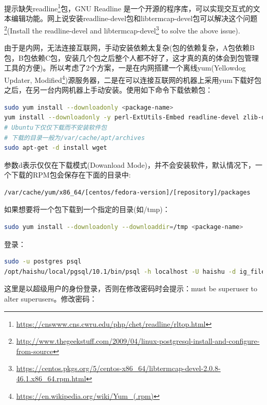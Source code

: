\documentclass[12pt]{book}
\numberwithin{dummy}{section}
\theoremstyle{ocrenumbox}
\theoremstyle{blacknumex}
\theoremstyle{blacknumbox}
\theoremstyle{ocrenum}
\begin{document}
提示缺失readline\footnote{\url{https://cnswww.cns.cwru.edu/php/chet/readline/rltop.html}}包，GNU Readline 是一个开源的程序库，可以实现交互式的文本编辑功能。网上说安装readline-devel包和libtermcap-devel包可以解决这个问题\footnote{\url{http://www.thegeekstuff.com/2009/04/linux-postgresql-install-and-configure-from-source}}(Install the readline-devel and libtermcap-devel\footnote{\url{https://centos.pkgs.org/5/centos-x86_64/libtermcap-devel-2.0.8-46.1.x86_64.rpm.html}} to solve the above issue).

由于是内网，无法连接互联网，手动安装依赖太复杂(包的依赖复杂，A包依赖B包，B包依赖C包，安装几个包之后整个人都不好了，这才真的真的体会到包管理工具的方便)。所以考虑了2个方案，一是在内网搭建一个离线yum(Yellowdog Updater, Modified\footnote{\url{https://en.wikipedia.org/wiki/Yum_(.rpm)}})源服务器，二是在可以连接互联网的机器上采用yum下载好包之后，在另一台内网机器上手动安装。使用如下命令下载依赖包：

\begin{lstlisting}[language=Bash]
sudo yum install --downloadonly <package-name>
yum install --downloadonly -y perl-ExtUtils-Embed readline-devel zlib-devel pam-devel libxml2-devel libxslt-devel openldap-devel python-devel gcc-c++ openssl-devel cmake
# Ubuntu下仅仅下载而不安装软件包
# 下载的目录一般为/var/cache/apt/archives
sudo apt-get -d install wget
\end{lstlisting}

参数d表示仅仅在下载模式(Dowanload Mode)，并不会安装软件，默认情况下，一个下载的RPM包会保存在下面的目录中:

\begin{lstlisting}[language=Bash]
/var/cache/yum/x86_64/[centos/fedora-version]/[repository]/packages 
\end{lstlisting}

如果想要将一个包下载到一个指定的目录(如/tmp)：

\begin{lstlisting}[language=Bash]
sudo yum install --downloadonly --downloaddir=/tmp <package-name> 
\end{lstlisting}


登录：

\begin{lstlisting}[language=Bash]
sudo -u postgres psql
/opt/haishu/local/pgsql/10.1/bin/psql -h localhost -U haishu -d ig_file_xycq
\end{lstlisting}

这里是以超级用户的身份登录，否则在修改密码时会提示：must be superuser to alter superusers。修改密码：
\end{document}
